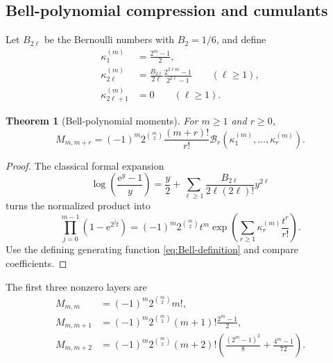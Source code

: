 \documentclass[11pt,oneside]{article}
\numberwithin{equation}{section}
\newtheorem{theorem}{Theorem}[section]
\theoremstyle{definition}
\theoremstyle{remark}
\newcommand{\e}{\mathrm e}
\newcommand{\Bell}{\mathcal B}
\begin{document}
\subsection{Bell-polynomial compression and cumulants}

Let \(B_{2\ell}\) be the Bernoulli numbers with \(B_2=1/6\), and define
\begin{align}
 \kappa_1^{(m)}&=\frac{2^m-1}{2},
 \label{eq:kappa-one}\\
 \kappa_{2\ell}^{(m)}
 &=\frac{B_{2\ell}}{2\ell}
   \frac{2^{2\ell m}-1}{2^{2\ell}-1}
   \qquad(\ell\ge1),
 \label{eq:kappa-even}\\
 \kappa_{2\ell+1}^{(m)}&=0
   \qquad(\ell\ge1).
 \label{eq:kappa-odd}
\end{align}

\begin{theorem}[Bell-polynomial moments]
\label{thm:Bell-moments}
For \(m\ge1\) and \(r\ge0\),
\begin{equation}
  \boxed{
  M_{m,m+r}=(-1)^m2^{\binom m2}
    \frac{(m+r)!}{r!}
    \Bell_r\!\left(
       \kappa_1^{(m)},\ldots,\kappa_r^{(m)}
    \right).}
  \label{eq:Bell-moments}
\end{equation}
\end{theorem}

\begin{proof}
The classical formal expansion
\begin{equation}
  \log\!\left(\frac{\e^y-1}{y}\right)
  =\frac y2+
   \sum_{\ell\ge1}
   \frac{B_{2\ell}}{2\ell(2\ell)!}y^{2\ell}
  \label{eq:log-expm1}
\end{equation}
turns the normalized product into
\begin{equation}
 \prod_{j=0}^{m-1}(1-\e^{2^jt})
 =(-1)^m2^{\binom m2}t^m
  \exp\!\left(
    \sum_{r\ge1}\kappa_r^{(m)}\frac{t^r}{r!}
  \right).
  \label{eq:moment-Bell-factor}
\end{equation}
Use the defining generating function \eqref{eq:Bell-definition} and compare
coefficients.
\end{proof}

The first three nonzero layers are
\begin{align}
 M_{m,m}
 &=(-1)^m2^{\binom m2}m!,
 \label{eq:moment-layer0}\\
 M_{m,m+1}
 &=(-1)^m2^{\binom m2}(m+1)!\frac{2^m-1}{2},
 \label{eq:moment-layer1}\\
 M_{m,m+2}
 &=(-1)^m2^{\binom m2}(m+2)!
   \left(
     \frac{(2^m-1)^2}{8}+\frac{4^m-1}{72}
   \right).
 \label{eq:moment-layer2}
\end{align}
\end{document}
